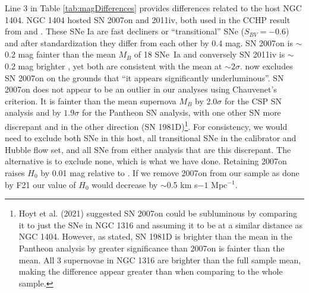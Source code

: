 \documentclass[twocolumn]{aastex62}
\begin{document}
\begin{enumerate}
    Line 3 in Table \ref{tab:magDifferences} provides differences related to the host NGC 1404. NGC 1404 hosted SN 2007on and 2011iv, both used in the CCHP result from \cite{2019ApJ...882...34F} and \cite{2020ApJ...891...57F}. These SNe Ia are fast decliners or ``transitional'' SNe ($S_{BV}=-0.6$) and after standardization they differ from each other by 0.4 mag. SN 2007on is $\sim$0.2 mag fainter than the mean $M_B$ of 18 SNe~Ia and conversely SN 2011iv is $\sim$0.2 mag brighter \citep{2019ApJ...882...34F}, yet both are consistent with the mean at $\sim2\sigma$. \cite{2021arXiv210615656F} now excludes SN 2007on on the grounds that ``it appears significantly underluminous''.  SN 2007on does not appear to be an outlier in our analyses using Chauvenet's criterion. It is fainter than the mean supernova $M_B$ by 2.0$\sigma$ for the CSP SN analysis and by $1.9 \sigma$ for the Pantheon SN analysis, with one other SN more discrepant and in the other direction (SN 1981D)\footnote{Hoyt et al. (2021) suggested SN 2007on could be subluminous by comparing it to just the SNe in NGC 1316 and assuming it to be at a similar distance as NGC 1404. However, as stated, SN 1981D is brighter than the mean in the Pantheon analysis by greater significance than 2007on is fainter than the mean. All 3 supernovae in NGC 1316 are brighter than the full sample mean, making the difference appear greater than when comparing to the whole sample.}. For consistency, we would need to exclude both SNe in this host, all transitional SNe in the calibrator and Hubble flow set, and all SNe from either analysis that are this discrepant. The alternative is to exclude none, which is what we have done. Retaining 2007on raises $H_0$ by 0.01 mag relative to \cite{2021arXiv210615656F}. If we remove 2007on from our sample as done by F21 our value of $H_0$ would decrease by $\sim$0.5 km s${-1}$ Mpc$^{-1}$.  
    

    \end{enumerate}
    
\end{document}
